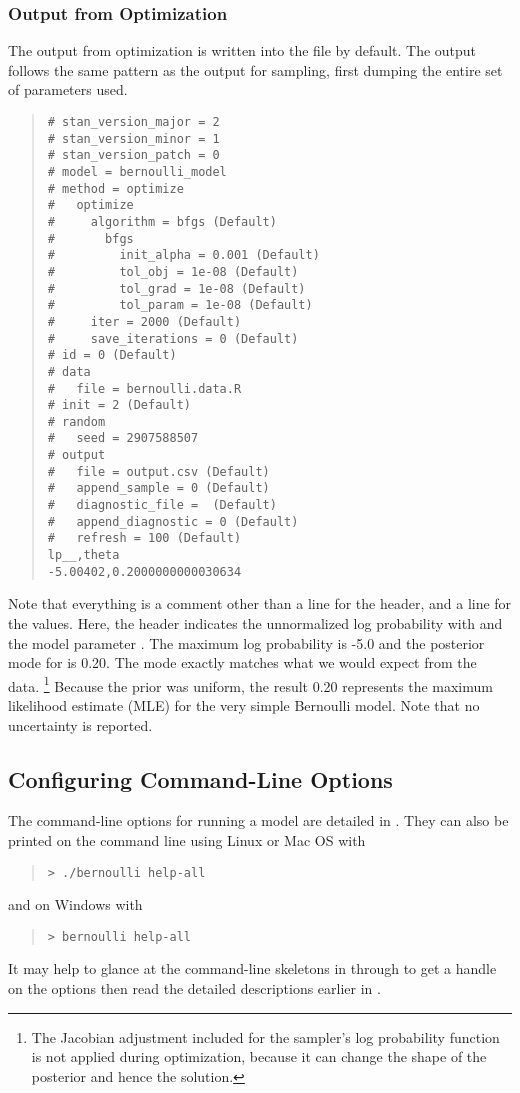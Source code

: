\subsubsection{Output from Optimization}

The output from optimization is written into the file
 by default.  The output follows the same pattern as the
output for sampling, first dumping the entire set of parameters used.
%
\begin{quote}
\begin{Verbatim}[fontsize=\small]
# stan_version_major = 2
# stan_version_minor = 1
# stan_version_patch = 0
# model = bernoulli_model
# method = optimize
#   optimize
#     algorithm = bfgs (Default)
#       bfgs
#         init_alpha = 0.001 (Default)
#         tol_obj = 1e-08 (Default)
#         tol_grad = 1e-08 (Default)
#         tol_param = 1e-08 (Default)
#     iter = 2000 (Default)
#     save_iterations = 0 (Default)
# id = 0 (Default)
# data
#   file = bernoulli.data.R
# init = 2 (Default)
# random
#   seed = 2907588507
# output
#   file = output.csv (Default)
#   append_sample = 0 (Default)
#   diagnostic_file =  (Default)
#   append_diagnostic = 0 (Default)
#   refresh = 100 (Default)
lp__,theta
-5.00402,0.2000000000030634
\end{Verbatim}
\end{quote}
%
Note that everything is a comment other than a line for the header,
and a line for the values.  Here, the header indicates the
unnormalized log probability with  and the model
parameter .  The maximum log probability is -5.0 and the
posterior mode for  is 0.20.  The mode exactly matches
what we would expect from the data.  
%
\footnote{The Jacobian adjustment included for the sampler's log
  probability function is not applied during optimization, because it can
  change the shape of the posterior and hence the solution.}
%
Because the prior was uniform, the result 0.20 represents the maximum
likelihood estimate (MLE) for the very simple Bernoulli model.  Note
that no uncertainty is reported.  


\subsection{Configuring Command-Line Options}

The command-line options for running a model are detailed in
. They can also be printed on the command line
using Linux or Mac OS with
%
\begin{quote}
\begin{Verbatim}[fontshape=sl]
> ./bernoulli help-all
\end{Verbatim}
\end{quote}
%
and on Windows with
%
\begin{quote}
\begin{Verbatim}[fontshape=sl]
> bernoulli help-all
\end{Verbatim}
\end{quote}
%
It may help to glance at the command-line skeletons in
 through  to get
a handle on the options then read the detailed descriptions earlier in
.

